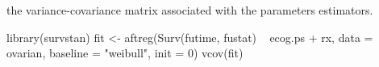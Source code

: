 \documentclass[letterpaper]{book}
\begin{document}
%
\begin{Value}
the variance-covariance matrix associated with the parameters estimators.
\end{Value}
%
\begin{Examples}
\begin{ExampleCode}

library(survstan)
fit <- aftreg(Surv(futime, fustat) ~ ecog.ps + rx, data = ovarian, baseline = "weibull", init = 0)
vcov(fit)


\end{ExampleCode}
\end{Examples}
\printindex{}
\end{document}

